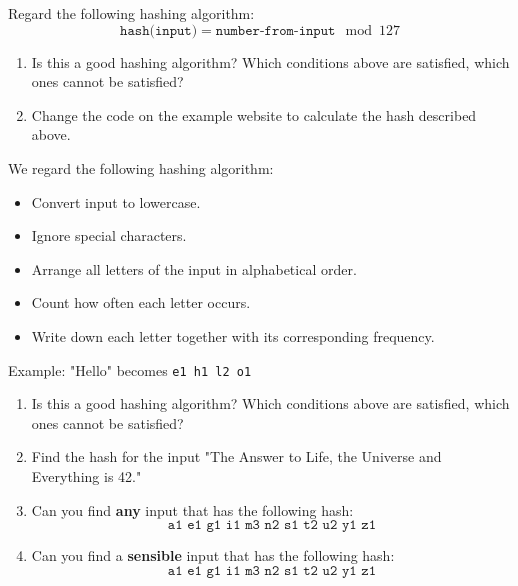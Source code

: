 \documentclass[11pt,a4paper]{report}
\begin{document}
\begin{ex}
Regard the following hashing algorithm: 
\[
\texttt{hash(input)} = \texttt{number-from-input} \mod 127
\]
\begin{enumerate}
\item Is this a good hashing algorithm?
Which conditions above are satisfied, which ones cannot be satisfied?
\item Change the code on the example website to calculate the hash described above.
\end{enumerate}
\end{ex}

\begin{ex}
We regard the following hashing algorithm: 
\begin{itemize}
\item Convert input to lowercase.
\item Ignore special characters.
\item Arrange all letters of the input in alphabetical order.
\item Count how often each letter occurs.
\item Write down  each letter together with its corresponding frequency.
\end{itemize}
Example: "Hello" becomes \texttt{e1 h1 l2 o1}
\begin{enumerate}
\item Is this a good hashing algorithm?
Which conditions above are satisfied, which ones cannot be satisfied?
\item Find the hash for the input "The Answer to Life, the Universe and Everything is 42."
\item Can you find {\bf any} input that has the following hash:
\[
\texttt{a1 e1 g1 i1 m3 n2 s1 t2 u2 y1 z1}
\]
\item Can you find a {\bf sensible} input that has the following hash:
\[
\texttt{a1 e1 g1 i1 m3 n2 s1 t2 u2 y1 z1}
\]
\end{enumerate}
\end{ex}
\end{document}
